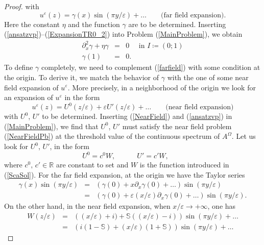 \documentclass[11pt,a4paper]{article}
\newcommand{\eps}{\varepsilon}
\newcommand{\Om}{\Omega}
\newcommand{\R}{\mathbb{R}}
\begin{document}
\begin{proof}
with 
\begin{equation}\label{ExpansionTR0_2}
u^\eps(z)=\gamma(x)\sin(\pi y/\eps)+\dots\qquad\mbox{(far field expansion)}.
\end{equation}
Here the constant $\eta$ and the function $\gamma$ are to be determined. Inserting (\ref{ansatzvp})--(\ref{ExpansionTR0_2}) into Problem (\ref{MainProblem}), we obtain 
\begin{equation}\label{farfield}
\begin{array}{|rcl}
\partial^2_x\gamma+\eta\gamma&=&0\quad\mbox{ in }I\coloneqq(0;1)\\[3pt]
\gamma(1)&=&0.
\end{array}
\end{equation}
To define $\gamma$ completely, we need to complement (\ref{farfield}) with some condition at the origin. To derive it, we match the behavior of $\gamma$ with the one of some near field expansion of $u^\eps$. More precisely, in a neighborhood of the origin we look for an expansion of $u^\eps$ in the form 
\begin{equation}\label{NearField}
u^\eps(z)=U^0(z/\eps)+\eps U'(z/\eps)+\dots \qquad\mbox{(near field expansion)}
\end{equation}
with $U^0$, $U'$ to be determined. Inserting (\ref{NearField}) and (\ref{ansatzvp}) in (\ref{MainProblem}), we find that $U^0$, $U'$ must satisfy the near field problem (\ref{NearFieldPb}) at the threshold value of the continuous spectrum of $A^\Om$. Let us look for $U^0$, $U'$, in the form 
\[
U^0=c^0W,\qquad \quad U'=c'W,\qquad
\]
where $c^0,\,c'\in\R$ are constant to set and $W$ is the function introduced in (\ref{ScaSol}). For the far field expansion, at the origin we have the Taylor series
\begin{equation}\label{TaylorFarField0}
\begin{array}{rcl}
\gamma(x)\sin(\pi y/\eps) &= &(\gamma(0)+x\partial_x\gamma(0)+\dots)\sin(\pi y/\eps) \\[4pt]
&= &(\gamma(0)+\eps (x/\eps)\partial_x\gamma(0)+\dots)\sin(\pi y/\eps).
\end{array}
\end{equation}
On the other hand, in the near field expansion, when $x/\eps\to+\infty$, one has
\begin{equation}\label{NearField0}
\begin{array}{rcl}
W(z/\eps)&=&\left((x/\eps)+i)+\mathbb{S}((x/\eps)-i)\right)\sin(\pi y/\eps)+\dots\\[4pt]
&=&\left(i(1-\mathbb{S})+(x/\eps)(1+\mathbb{S})\right)\sin(\pi y/\eps)+\dots

\end{array}
\end{equation}
\end{proof}
\end{document}
